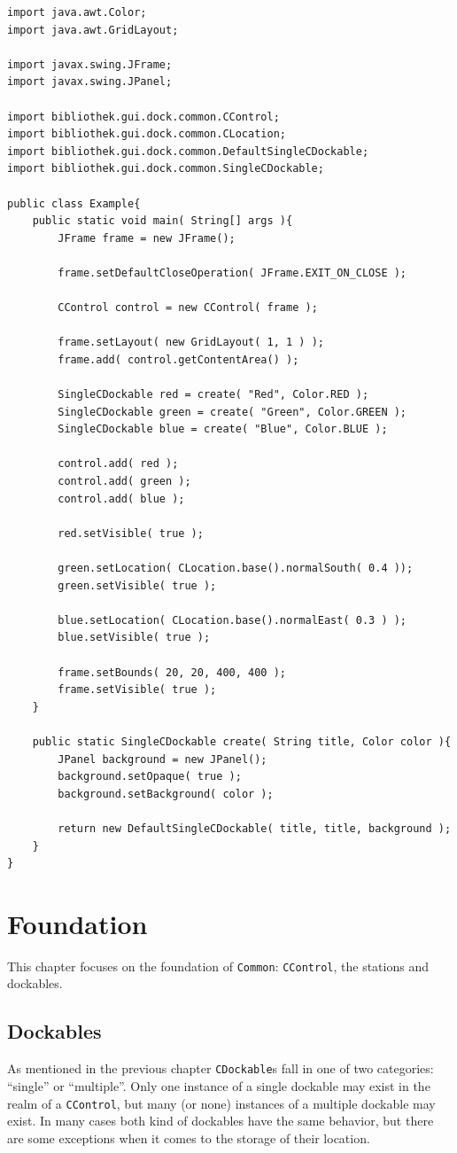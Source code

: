 \documentclass[a4paper,10pt]{article}
\newcommand{\src}[1]{\texttt{#1}}
\begin{document}
\begin{lstlisting}
import java.awt.Color;
import java.awt.GridLayout;

import javax.swing.JFrame;
import javax.swing.JPanel;

import bibliothek.gui.dock.common.CControl;
import bibliothek.gui.dock.common.CLocation;
import bibliothek.gui.dock.common.DefaultSingleCDockable;
import bibliothek.gui.dock.common.SingleCDockable;

public class Example{
	public static void main( String[] args ){
		JFrame frame = new JFrame();
		
		frame.setDefaultCloseOperation( JFrame.EXIT_ON_CLOSE );
		
		CControl control = new CControl( frame );
		
		frame.setLayout( new GridLayout( 1, 1 ) );
		frame.add( control.getContentArea() );
		
		SingleCDockable red = create( "Red", Color.RED );
		SingleCDockable green = create( "Green", Color.GREEN );
		SingleCDockable blue = create( "Blue", Color.BLUE );
		
		control.add( red );
		control.add( green );
		control.add( blue );
		
		red.setVisible( true );
		
		green.setLocation( CLocation.base().normalSouth( 0.4 ));
		green.setVisible( true );
		
		blue.setLocation( CLocation.base().normalEast( 0.3 ) );
		blue.setVisible( true );
		
		frame.setBounds( 20, 20, 400, 400 );
		frame.setVisible( true );
	}
	
	public static SingleCDockable create( String title, Color color ){
		JPanel background = new JPanel();
		background.setOpaque( true );
		background.setBackground( color );
		
		return new DefaultSingleCDockable( title, title, background );
	}
}

\end{lstlisting}

\newpage
\section{Foundation}
This chapter focuses on the foundation of \src{Common}: \src{CControl}, the stations and dockables.

\subsection{Dockables}
As mentioned in the previous chapter \src{CDockable}s fall in one of two categories: ``single'' or ``multiple''. Only one instance of a single dockable may exist in the realm of a \src{CControl}, but many (or none) instances of a multiple dockable may exist. In many cases both kind of dockables have the same behavior, but there are some exceptions when it comes to the storage of their location.
\end{document}
